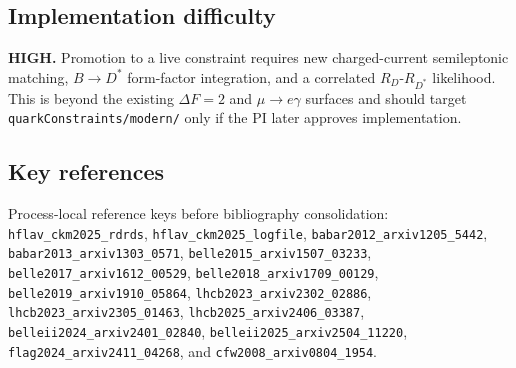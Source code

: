 \subsection*{Implementation difficulty}
\textbf{HIGH.}  Promotion to a live constraint requires new charged-current
semileptonic matching, \(B\to D^*\) form-factor integration, and a correlated
\(R_D\)-\(R_{D^*}\) likelihood.  This is beyond the existing \(\Delta F=2\)
and \(\mu\to e\gamma\) surfaces and should target \texttt{quarkConstraints/modern/}
only if the PI later approves implementation.

\subsection*{Key references}
Process-local reference keys before bibliography consolidation:
\texttt{hflav\_ckm2025\_rdrds},
\texttt{hflav\_ckm2025\_logfile},
\texttt{babar2012\_arxiv1205\_5442},
\texttt{babar2013\_arxiv1303\_0571},
\texttt{belle2015\_arxiv1507\_03233},
\texttt{belle2017\_arxiv1612\_00529},
\texttt{belle2018\_arxiv1709\_00129},
\texttt{belle2019\_arxiv1910\_05864},
\texttt{lhcb2023\_arxiv2302\_02886},
\texttt{lhcb2023\_arxiv2305\_01463},
\texttt{lhcb2025\_arxiv2406\_03387},
\texttt{belleii2024\_arxiv2401\_02840},
\texttt{belleii2025\_arxiv2504\_11220},
\texttt{flag2024\_arxiv2411\_04268}, and
\texttt{cfw2008\_arxiv0804\_1954}.
